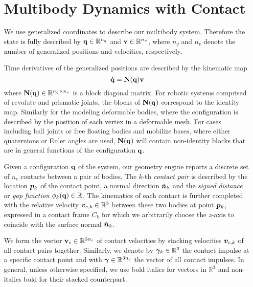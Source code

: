 \section{Multibody Dynamics with Contact}
\label{sec:multibody_dynamics_with_contact}

We use generalized coordinates to describe our multibody system. Therefore the
state is fully described by ${\mathbf{q}}\in\mathbb{R}^{n_q}$ and
${\mathbf{v}}\in\mathbb{R}^{n_v}$, where $n_q$ and $n_v$ denote the number of
generalized positions and velocities, respectively.

Time derivatives of the generalized positions are described by the kinematic map
\begin{equation}
	\dot{\mf{q}} = \mf{N}(\mf{q})\mf{v}
	\label{eq:kinematic_map}
\end{equation}
where ${\mathbf{N}}({\mathbf{q}})\in\mathbb{R}^{n_q\times n_v}$ is a block diagonal matrix.
For robotic systems comprised of revolute and prismatic joints, the blocks of
${\mathbf{N}}({\mathbf{q}})$ correspond to the identity map. Similarly for the modeling
deformable bodies, where the configuration is described by the position of each
vertex in a deformable mesh. For cases including ball joints or free floating
bodies and mobilize bases, where either quaternions or Euler angles are used,
${\mathbf{N}}({\mathbf{q}})$ will contain non-identity blocks that are in general functions
of the configuration ${\mathbf{q}}$.

Given a configuration ${\mathbf{q}}$ of the system, our geometry engine reports a
discrete set of $n_c$ contacts between a pair of bodies. The $k\text{-th}$
\emph{contact pair} is described by the location ${\bm{p}}_k$ of the contact
point, a normal direction $\hat{{\bm{n}}}_k$ and the \emph{signed distance} or
\emph{gap function} $\phi_k({\mathbf{q}})\in\mathbb{R}$. The kinematics of each
contact is further completed with the relative velocity
${\bm{v}}_{c,k}\in\mathbb{R}^3$ between these two bodies at point ${\bm{p}}_k$,
expressed in a contact frame $C_k$ for which we arbitrarily choose the
$z\text{-axis}$ to coincide with the surface normal $\hat{{\bm{n}}}_k$. 

We form the vector ${\mathbf{v}}_{c}\in\mathbb{R}^{3n_c}$ of contact velocities by
stacking velocities ${\bm{v}}_{c,k}$ of all contact pairs together. Similarly, we
denote by ${\bm\gamma}_k\in\mathbb{R}^3$ the contact impulse at a specific contact
point and with ${\bm\gamma}\in\mathbb{R}^{3n_c}$ the vector of all contact impulses.
In general, unless otherwise specified, we use bold italics for vectors in
$\mathbb{R}^3$ and non-italics bold for their stacked counterpart.

